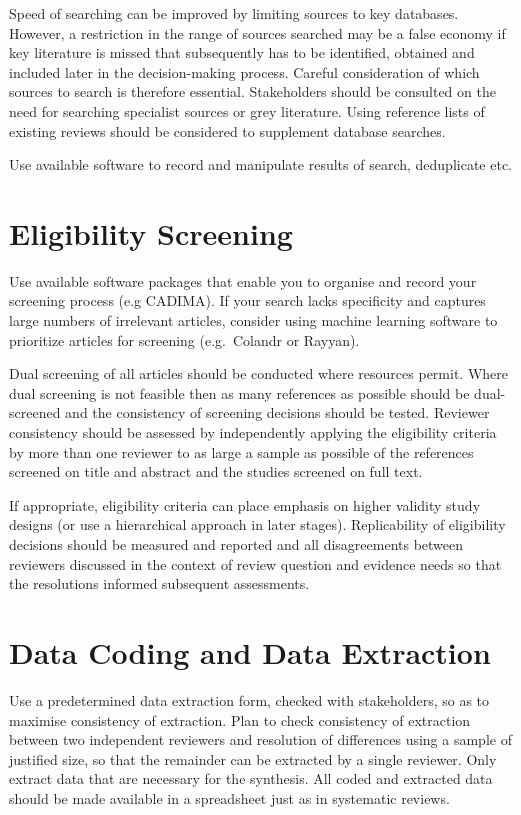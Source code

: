 \documentclass[
  letterpaper,
  DIV=11,
  numbers=noendperiod]{scrreprt}
\begin{document}
Speed of searching can be improved by limiting sources to key databases.
However, a restriction in the range of sources searched may be a false
economy if key literature is missed that subsequently has to be
identified, obtained and included later in the decision-making process.
Careful consideration of which sources to search is therefore essential.
Stakeholders should be consulted on the need for searching specialist
sources or grey literature. Using reference lists of existing reviews
should be considered to supplement database searches.

Use available software to record and manipulate results of search,
deduplicate etc.

\section{Eligibility Screening}\label{eligibility-screening-1}

Use available software packages that enable you to organise and record
your screening process (e.g CADIMA). If your search lacks specificity
and captures large numbers of irrelevant articles, consider using
machine learning software to prioritize articles for screening
(e.g.~Colandr or Rayyan).

Dual screening of all articles should be conducted where resources
permit. Where dual screening is not feasible then as many references as
possible should be dual-screened and the consistency of screening
decisions should be tested. Reviewer consistency should be assessed by
independently applying the eligibility criteria by more than one
reviewer to as large a sample as possible of the references screened on
title and abstract and the studies screened on full text.

If appropriate, eligibility criteria can place emphasis on higher
validity study designs (or use a hierarchical approach in later stages).
Replicability of eligibility decisions should be measured and reported
and all disagreements between reviewers discussed in the context of
review question and evidence needs so that the resolutions informed
subsequent assessments.

\section{Data Coding and Data
Extraction}\label{data-coding-and-data-extraction-1}

Use a predetermined data extraction form, checked with stakeholders, so
as to maximise consistency of extraction. Plan to check consistency of
extraction between two independent reviewers and resolution of
differences using a sample of justified size, so that the remainder can
be extracted by a single reviewer. Only extract data that are necessary
for the synthesis. All coded and extracted data should be made available
in a spreadsheet just as in systematic reviews.
\end{document}

